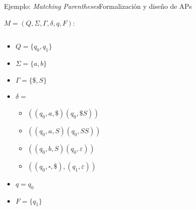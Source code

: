 \documentclass[spanish]{beamer}
\begin{document}
\begin{frame}{Ejemplo: \textit{Matching Parentheses}}{Formalización y diseño de APs}

    $M = (Q, \Sigma, \Gamma, \delta, q, F)$:

    \begin{columns}
        \begin{column}{0.4\textwidth}
            \begin{itemize}
                \item $Q = \{q_0, q_1\}$
                \item $\Sigma = \{a,b\}$
                \item $\Gamma = \{\$, S\}$
                \item $\delta =$
                \begin{itemize}
                    \item $((q_0,a,\$)(q_0,\$S))$
                    \item $((q_0,a,S)(q_0,SS))$
                    \item $((q_0,b,S)(q_0,\varepsilon))$
                    \item $((q_0,\square,\$),(q_1,\varepsilon))$
                \end{itemize}
                \item $q = q_0$
                \item $F = \{q_1\}$
            \end{itemize}
        \end{column}
        \begin{column}{0.6\textwidth}
        \end{column}
    \end{columns}
    
\end{frame}
\end{document}
